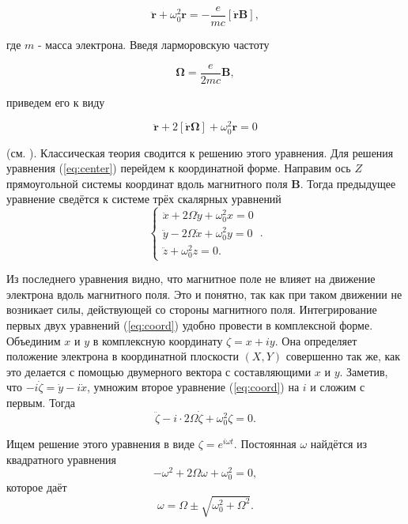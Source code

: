 \documentclass[12pt]{article}
\begin{document}
  \[
  \ddot{\mathbf{r}}+\omega_0^2 \mathbf{r}=-\frac{e}{m c}[\dot{\mathbf{r}} \mathbf{B}],
  \]

  где $m$ - масса электрона. Введя ларморовскую частоту

  \begin{equation}
  \boldsymbol{\Omega}=\frac{e}{2 m c} \mathbf{B},
  \label{eq:larm}
  \end{equation}

  приведем его к виду

  \begin{equation}
  \ddot{\mathbf{r}}+2[\dot{\mathbf{r}} \boldsymbol{\Omega}]+\omega_0^2 \mathbf{r}=0
  \label{eq:center}
  \end{equation}

  (см. \cite[\S 86]{sivykhin3}). Классическая теория сводится к решению этого уравнения. Для решения уравнения (\ref{eq:center}) перейдем к координатной форме. Направим ось $Z$ прямоугольной системы координат вдоль магнитного поля $\mathbf{B}$. Тогда предыдущее уравнение сведётся к системе трёх скалярных уравнений
  \begin{equation}
  \begin{cases}
  \ddot{x} + 2\Omega \dot{y} + \omega_0^2 x = 0 \\
  \ddot{y} - 2\Omega \dot{x} + \omega_0^2 y = 0 \\
  \ddot{z} + \omega_0^2 z = 0.
  \end{cases}\,.
  \label{eq:coord}
  \end{equation}

  Из последнего уравнения видно, что магнитное поле не влияет на движение электрона вдоль магнитного поля. Это и понятно, так как при таком движении не возникает силы, действующей со стороны магнитного поля. Интегрирование первых двух уравнений (\ref{eq:coord}) удобно провести в комплексной форме. Объединим $x$ и $y$ в комплексную координату $\zeta = x + iy$. Она определяет положение электрона в координатной плоскости $(X, Y)$ совершенно так же, как это делается с помощью двумерного вектора с составляющими $x$ и $y$. Заметив, что $-i\dot{\zeta} = \dot{y} - i\dot{x}$, умножим второе уравнение (\ref{eq:coord}) на $i$ и сложим с первым. Тогда
  \[
  \ddot{\zeta} - i \cdot 2\Omega \dot{\zeta} + \omega_0^2 \zeta = 0.
  \]

  Ищем решение этого уравнения в виде $\zeta = e^{i\omega t}$. Постоянная $\omega$ найдётся из квадратного уравнения
  \[
  -\omega^2 + 2\Omega \omega + \omega_0^2 = 0,
  \]
  которое даёт
  \[
  \omega = \Omega \pm \sqrt{\omega_0^2 + \Omega^2}.
  \]
\end{document}

